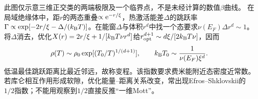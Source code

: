 \begin{center}
\end{center}
此图仅示意三维正交类的两端极限及一个临界点，不是未经计算的数值$\beta$曲线。
在局域绝缘体中，距$r$的两态重叠$\propto\mathrm e^{-r/\xi}$，热激活能差$\Delta$的跳跃率$\Gamma\propto\exp[-2r/\xi-\Delta/(k_{\mathrm B} T)]$。在能窗$\Delta$与体积$r^d$中找一个态要求$\nu(E_F)\Delta r^d\sim1$。将$\Delta$消去，优化$X(r)=2r/\xi+1/[k_{\mathrm B} T\nu r^d]$给$r_{\rm opt}^{d+1}\sim d\xi/[2k_{\mathrm B} T\nu]$，因而
\begin{equation}
\rho(T)\sim\rho_0\exp[(T_0/T)^{1/(d+1)}],\qquad k_{\mathrm B} T_0\sim\frac1{\nu(E_F)\xi^d}.
\end{equation}
低温最佳跳跃距离比最近邻远，故称变程。该指数要求费米能附近态密度近常数。若库仑相互作用形成软隙，优化能量--距离关系改变，常出现Efros--Shklovskii的$1/2$指数；不能用观察到$1/2$直接反推“一维Mott”。
